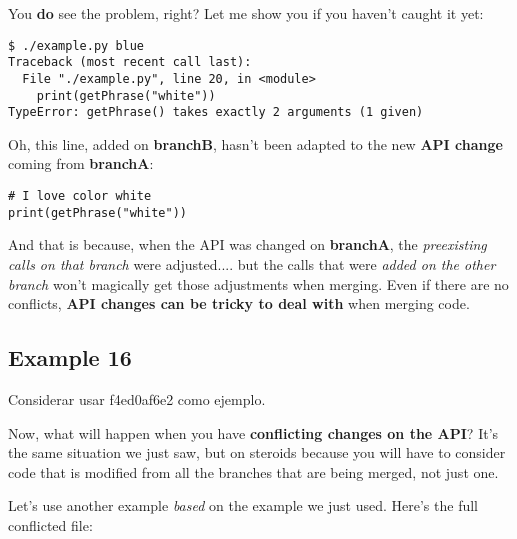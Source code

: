 You {\bf do} see the problem, right? Let me show you if you haven't caught it yet:

\begin{lstlisting}[style=console_style,
	basicstyle=\small,
	caption={\bf example 15} - we have a problem]
$ ./example.py blue
Traceback (most recent call last):
  File "./example.py", line 20, in <module>
    print(getPhrase("white"))
TypeError: getPhrase() takes exactly 2 arguments (1 given)
\end{lstlisting}

Oh, this line, added on {\bf branchB}, hasn't been adapted to the new {\bf API change} coming from {\bf branchA}:

\begin{lstlisting}[style=python_style,
	basicstyle=\small,
	firstnumber=19,
	caption={\bf example 15} - this is the problem]
# I love color white
print(getPhrase("white"))
\end{lstlisting}

And that is because, when the API was changed on {\bf branchA}, the {\it preexisting calls on that branch} were adjusted.... but the
calls that were {\it added on the other branch} won't magically get those adjustments when merging. Even if there are no conflicts,
{\bf API changes can be tricky to deal with} when merging code.

\subsection{Example 16}
\label{example_16}

Considerar usar f4ed0af6e2 como ejemplo.

Now, what will happen when you have {\bf conflicting changes on the API}? It's the same situation we just saw, but on steroids
because you will have to consider code that is modified from all the branches that are being merged, not just one.

Let's use another example {\it based} on the example we just used. Here's the full conflicted file:

